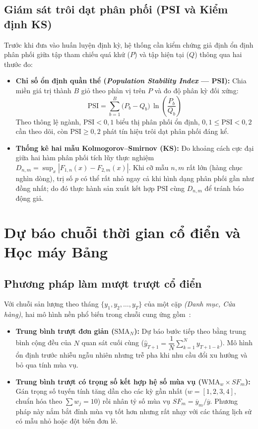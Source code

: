 \subsection{Giám sát trôi dạt phân phối (PSI và Kiểm định KS)}
Trước khi đưa vào huấn luyện định kỳ, hệ thống cần kiểm chứng giả định ổn định phân phối giữa tập tham chiếu quá khứ ($P$) và tập hiện tại ($Q$) thông qua hai thước đo:
\begin{itemize}[topsep=0pt, itemsep=1pt]
	\item \textbf{Chỉ số ổn định quần thể (\textit{Population Stability Index} --- PSI):} Chia miền giá trị thành $B$ giỏ theo phân vị trên $P$ và đo độ phân kỳ đối xứng:
	      \begin{equation}
		      \text{PSI} = \sum_{b=1}^{B} \bigl(P_b - Q_b\bigr)\,\ln\!\left(\dfrac{P_b}{Q_b}\right)
	      \end{equation}
	      Theo thông lệ ngành, $\text{PSI} < 0{,}1$ biểu thị phân phối ổn định, $0{,}1 \le \text{PSI} < 0{,}2$ cần theo dõi, còn $\text{PSI} \ge 0{,}2$ phát tín hiệu trôi dạt phân phối đáng kể.
	\item \textbf{Thống kê hai mẫu Kolmogorov--Smirnov (KS):} Đo khoảng cách cực đại giữa hai hàm phân phối tích lũy thực nghiệm $D_{n,m} = \sup_{x} |F_{1,n}(x) - F_{2,m}(x)|$. Khi cỡ mẫu $n, m$ rất lớn (hàng chục nghìn dòng), trị số $p$ có thể rất nhỏ ngay cả khi hình dạng phân phối gần như đồng nhất; do đó thực hành sản xuất kết hợp $\text{PSI}$ cùng $D_{n,m}$ để tránh báo động giả.
\end{itemize}

\section{Dự báo chuỗi thời gian cổ điển và Học máy Bảng}
\label{sec:bg-forecast}

\subsection{Phương pháp làm mượt trượt cổ điển}
Với chuỗi sản lượng theo tháng $\{y_1, y_2, \dots, y_T\}$ của một cặp \textit{(Danh mục, Cửa hàng)}, hai mô hình nền phổ biến trong chuỗi cung ứng gồm~\cite{hyndman2021forecasting}:
\begin{itemize}[topsep=0pt, itemsep=1pt]
	\item \textbf{Trung bình trượt đơn giản ($\text{SMA}_N$):} Dự báo bước tiếp theo bằng trung bình cộng đều của $N$ quan sát cuối cùng ($\hat{y}_{T+1} = \dfrac{1}{N}\sum_{k=1}^{N} y_{T+1-k}$). Mô hình ổn định trước nhiễu ngẫu nhiên nhưng trễ pha khi nhu cầu đổi xu hướng và bỏ qua tính mùa vụ.
	\item \textbf{Trung bình trượt có trọng số kết hợp hệ số mùa vụ ($\text{WMA}_w \times SF_m$):} Gán trọng số tuyến tính tăng dần cho các kỳ gần nhất ($w=[1, 2, 3, 4]$, chuẩn hóa theo $\sum w_j = 10$) rồi nhân tỷ số mùa vụ $SF_m = \overline{y}_m / \overline{y}$. Phương pháp này nắm bắt đỉnh mùa vụ tốt hơn nhưng rất nhạy với các tháng lịch sử có mẫu nhỏ hoặc đột biến đơn lẻ.
\end{itemize}

